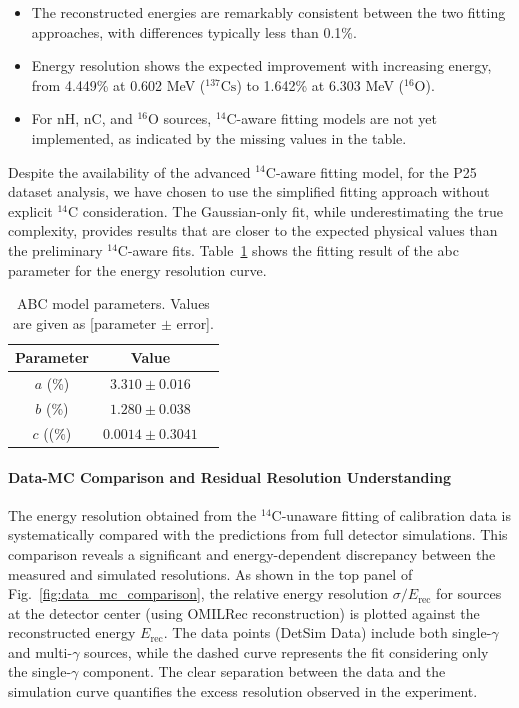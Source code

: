 \begin{itemize}
    \item The reconstructed energies are remarkably consistent between the two fitting approaches, with differences typically less than 0.1\%.
    \item Energy resolution shows the expected improvement with increasing energy, from 4.449\% at 0.602 MeV ($^{137}\text{Cs}$) to 1.642\% at 6.303 MeV ($^{16}\text{O}$).
    \item For nH, nC, and $^{16}\text{O}$ sources, $^{14}\text{C}$-aware fitting models are not yet implemented, as indicated by the missing values in the table.
\end{itemize}

Despite the availability of the advanced $^{14}\text{C}$-aware fitting model, for the P25 dataset analysis, we have chosen to use the simplified fitting approach without explicit $^{14}\text{C}$ consideration. The Gaussian-only fit, while underestimating the true complexity, provides results that are closer to the expected physical values than the preliminary $^{14}\text{C}$-aware fits. Table~\ref{tab:abc_params_simple} shows the fitting result of the abc parameter for the energy resolution curve.

\begin{table}[h!]
\centering
\caption{ABC model parameters. Values are given as [parameter $\pm$ error].}
\label{tab:abc_params_simple}
\begin{tabular}{ccc}
\toprule
\textbf{Parameter} & \textbf{Value} \\
\midrule
$a$ (\%) & $3.310 \pm 0.016$\\
$b$ (\%) & $1.280 \pm 0.038$\\
$c$ ((\%) & $0.0014 \pm 0.3041$\\
\bottomrule
\end{tabular}
\end{table}

\paragraph{Data-MC Comparison and Residual Resolution Understanding}
The energy resolution obtained from the $^{14}\text{C}$-unaware fitting of calibration data is systematically compared with the predictions from full detector simulations. This comparison reveals a significant and energy-dependent discrepancy between the measured and simulated resolutions. As shown in the top panel of Fig.~\ref{fig:data_mc_comparison}, the relative energy resolution $\sigma/E_{\text{rec}}$ for sources at the detector center (using OMILRec reconstruction) is plotted against the reconstructed energy $E_{\text{rec}}$. The data points (DetSim Data) include both single-$\gamma$ and multi-$\gamma$ sources, while the dashed curve represents the fit considering only the single-$\gamma$ component. The clear separation between the data and the simulation curve quantifies the excess resolution observed in the experiment.

